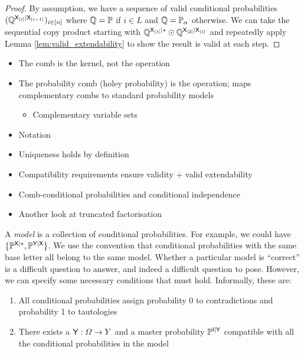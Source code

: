 \begin{proof}
By assumption, we have a sequence of valid conditional probabilities $(\mathbb{Q}^{\mathsf{X}_{[i]}|\mathsf{X}_{[i-1]}})_{i\in [n]}$ where $\mathbb{Q}=\mathbb{P}$ if $i\in L$ and $\mathbb{Q}=\mathbb{P}_\alpha$ otherwise. We can take the sequential copy product starting with $\mathbb{Q}^{\mathsf{X}_{[1]}|*}\odot \mathbb{Q}^{\mathsf{X}_{[2]}|\mathsf{X}_{[1]}}$ and repeatedly apply Lemma \ref{lem:valid_extendability} to show the result is valid at each step.
\end{proof}

\begin{itemize}
	\item The comb is the kernel, not the operation
	\item The probability comb (holey probability) is the operation; maps complementary combs to standard probability models
	\begin{itemize}
		\item Complementary variable sets
	\end{itemize}
	\item Notation
	\item Uniqueness holds by definition
	\item Compatibility requirements ensure validity + valid extendability 
	\item Comb-conditional probabilities and conditional independence
	\item Another look at truncated factorisation
\end{itemize}

A \emph{model} is a collection of conditional probabilities. For example, we could have $\{\mathbb{P}^{\mathsf{X}|*},\mathbb{P}^{\mathsf{Y}|\mathsf{X}}\}$. We use the convention that conditional probabilities with the same base letter all belong to the same model. Whether a particular model is ``correct'' is a difficult question to answer, and indeed a difficult question to pose. However, we can specify some necessary conditions that must hold. Informally, these are:

\begin{enumerate}
	\item All conditional probabilities assign probability 0 to contradictions and probability 1 to tautologies
	\item There exists a $\mathsf{Y}:\Omega\to Y$ and a master probability $\mathbb{P}^{\mathsf{I}|\mathsf{Y}}$ compatible with all the conditional probabilities in the model
\end{enumerate}

